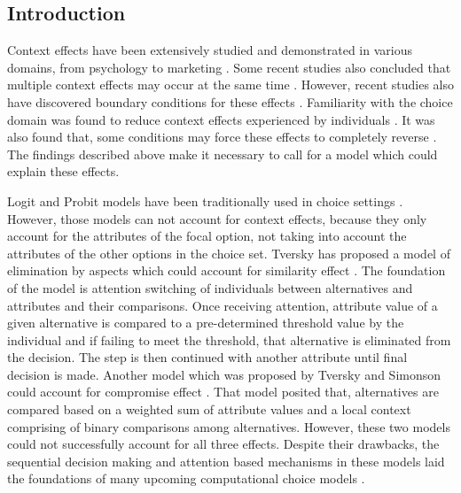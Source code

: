\documentclass[a4paper,12pt]{article}
\newcommand{\citeyearonly}[1]{\citeyearpar{#1}}
\begin{document}
\newpage

\subsection{Introduction}

Context effects have been extensively studied and demonstrated in various domains, from psychology to marketing \citep{herne1997decoy, soltani2012range, truebloodEtAl13, frederickEtAl14, evangelidisEtAl18, wuConsguner20}. Some recent studies also concluded that multiple context effects may occur at the same time \citep{berkowitsch2014rigorously, noguchi2014attraction}. However, recent studies also have discovered boundary conditions for these effects \citep{liew2016appropriacy, spektor2018good, spektor2019similarity}. Familiarity with the choice domain was found to reduce context effects experienced by individuals \citep{kim2005attraction, sheng2005understanding}.  It was also found that, some conditions may force these effects to completely reverse \citep{cataldo2019comparison}. The findings described above make it necessary to call for a model which could explain these effects.

Logit and Probit models have been traditionally used in choice settings \citep{gensch1979multinomial, kim2017probit}. However, those models can not account for context effects, because they only account for the attributes of the focal option, not taking into account the attributes of the other options in the choice set. Tversky has proposed a model of elimination by aspects which could account for similarity effect \citeyearonly{tversky1972elimination}. The foundation of the model is attention switching of individuals between alternatives and attributes and their comparisons. Once receiving attention, attribute value of a given alternative is compared to a pre-determined threshold value by the individual and if failing to meet the threshold, that alternative is eliminated from the decision. The step is then  continued with another attribute until final decision is made. Another model which was proposed by Tversky and Simonson could account for compromise effect \citeyearonly{tverskySimonson93}. That model posited that, alternatives are compared based on a weighted sum of attribute values and a local context comprising of binary comparisons among alternatives. However, these two models could not successfully account for all three effects. Despite their drawbacks, the sequential decision making and attention based mechanisms in these models laid the foundations of many upcoming computational choice models \citep{bhatia2013associations}. 
\end{document}
